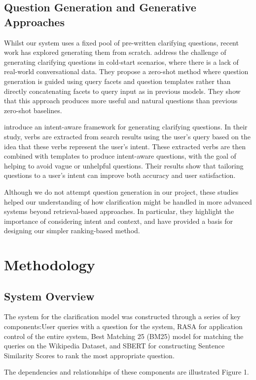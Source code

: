 \documentclass[11pt]{article}
\begin{document}
\subsection{Question Generation and Generative Approaches}
Whilst our system uses a fixed pool of pre-written clarifying questions, recent work has explored generating them from scratch. \citet{Wang2023} address the challenge of generating clarifying questions in cold-start scenarios, where there is a lack of real-world conversational data. They propose a zero-shot method where question generation is guided using query facets and question templates rather than directly concatenating facets to query input as in previous models. They show that this approach produces more useful and natural questions than previous zero-shot baselines.

\citet{Zhao2024} introduce an intent-aware framework for generating clarifying questions. In their study, verbs are extracted from search results using the user's query based on the idea that these verbs represent the user's intent. These extracted verbs are then combined with templates to produce intent-aware questions, with the goal of helping to avoid vague or unhelpful questions. Their results show that tailoring questions to a user's intent can improve both accuracy and user satisfaction.

Although we do not attempt question generation in our project, these studies helped our understanding of how clarification might be handled in more advanced systems beyond retrieval-based approaches. In particular, they highlight the importance of considering intent and context, and have provided a basis for designing our simpler ranking-based method.


\section{Methodology}
\subsection{System Overview}
The system for the clarification model was constructed through a series of key components:User queries with a question for the system, RASA for application control of the entire system, Best Matching 25 (BM25) model for matching the queries on the Wikipedia Dataset, and SBERT for constructing Sentence Similarity Scores to rank the most appropriate question.

The dependencies and relationships of these components are illustrated Figure 1.
\end{document}
